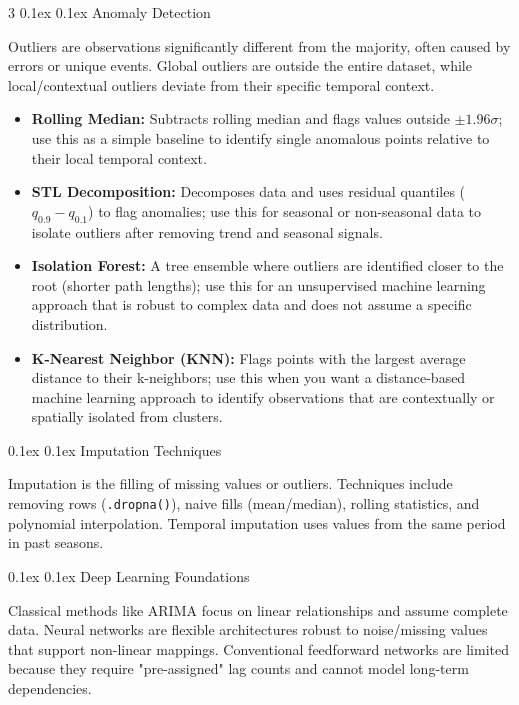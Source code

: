 \documentclass[8pt,landscape]{article}
\makeatletter
\renewcommand{\section}{\@startsection{section}{2}{0pt}%
    {0.1ex}%
    {0.1ex}%
    {\fontsize{8}{9}\bfseries\color{red}}} %
\newcommand{\code}[1]{\textcolor{myred}{\texttt{#1}}}
\newcommand{\smalltext}[1]{
  {\fontsize{8}{9}\selectfont\sloppy #1\par}
}
\makeatother
\begin{document}
\begin{multicols}{3}
\section{Anomaly Detection}
\smalltext{
Outliers are observations significantly different from the majority, often caused by errors or unique events. Global outliers are outside the entire dataset, while local/contextual outliers deviate from their specific temporal context.
}
\begin{itemize}
  \item \textbf{Rolling Median:} Subtracts rolling median and flags values outside $\pm1.96\sigma$; use this as a simple baseline to identify single anomalous points relative to their local temporal context.
  \item \textbf{STL Decomposition:} Decomposes data and uses residual quantiles ($q_{0.9} - q_{0.1}$) to flag anomalies; use this for seasonal or non-seasonal data to isolate outliers after removing trend and seasonal signals.
  \item \textbf{Isolation Forest:} A tree ensemble where outliers are identified closer to the root (shorter path lengths); use this for an unsupervised machine learning approach that is robust to complex data and does not assume a specific distribution.
  \item \textbf{K-Nearest Neighbor (KNN):} Flags points with the largest average distance to their k-neighbors; use this when you want a distance-based machine learning approach to identify observations that are contextually or spatially isolated from clusters.
\end{itemize}

\section{Imputation Techniques}
\smalltext{
Imputation is the filling of missing values or outliers. Techniques include removing rows (\code{.dropna()}), naive fills (mean/median), rolling statistics, and polynomial interpolation. Temporal imputation uses values from the same period in past seasons.
}

\section{Deep Learning Foundations}
\smalltext{
Classical methods like ARIMA focus on linear relationships and assume complete data. Neural networks are flexible architectures robust to noise/missing values that support non-linear mappings. Conventional feedforward networks are limited because they require "pre-assigned" lag counts and cannot model long-term dependencies.
}


\end{multicols}
\end{document}
